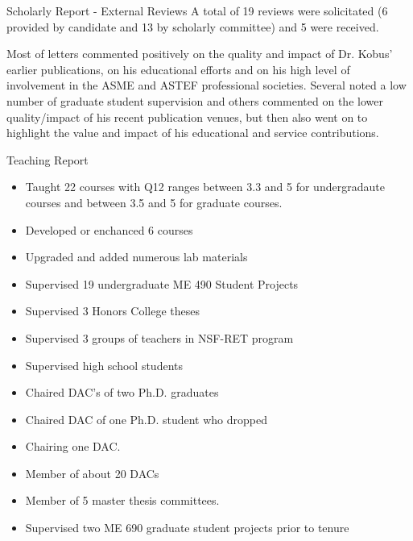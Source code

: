 \documentclass{beamer}
\begin{document}
\begin{frame}{Scholarly Report - External Reviews} 
A total of 19 reviews were solicitated (6 provided by candidate and 13 by scholarly committee) and 5 were received. 

\vspace{\fill}

Most of letters commented positively on the quality and impact of Dr. Kobus’ earlier publications, on his educational efforts and on his high level of involvement in the ASME and ASTEF professional societies. Several noted a low number of graduate student supervision and others commented on the lower quality/impact of his recent publication venues, but then also went on to highlight the value and impact of his educational and service contributions.

\end{frame}

\begin{frame}{Teaching Report}
\begin{itemize}
  \item Taught 22 courses with Q12 ranges between 3.3 and 5 for undergradaute courses and between 3.5 and 5 for graduate courses. 
  \item Developed or enchanced 6 courses
  \item Upgraded and added numerous lab materials
  \item Supervised 19 undergraduate ME 490 Student Projects 
  \item Supervised 3 Honors College theses
  \item Supervised 3 groups of teachers in NSF-RET program
  \item Supervised high school students
  \item Chaired DAC’s of two Ph.D. graduates
  \item Chaired DAC of one Ph.D. student who dropped
  \item Chairing one DAC. 
  \item Member of about 20 DACs
  \item Member of 5 master thesis committees.
  \item Supervised two ME 690 graduate student projects prior to tenure   
\end{itemize}

\end{frame}
\end{document}
